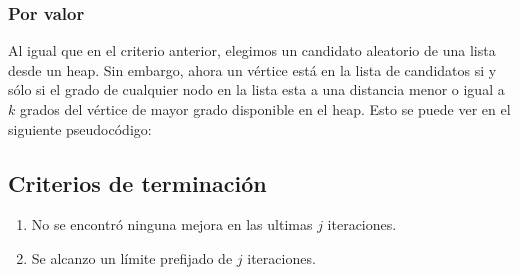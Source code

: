 \subsubsection{Por valor}

Al igual que en el criterio anterior, elegimos un candidato aleatorio de una lista desde un heap. Sin embargo, ahora un vértice está en la lista de candidatos si y sólo si el grado de cualquier nodo en la lista esta a una distancia menor o igual a $k$ grados del vértice de mayor grado disponible en el heap. Esto se puede ver en el siguiente pseudocódigo:

\begin{algorithmic}


	\EndIf
	
	\EndFor
\EndWhile
\EndProcedure
\end{algorithmic}

\subsection{Criterios de terminación}
\begin{enumerate}
\item No se encontró ninguna mejora en las ultimas $j$ iteraciones.
\item Se alcanzo un límite prefijado de  $j$ iteraciones.
\end{enumerate}
